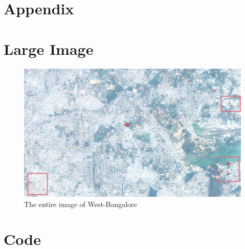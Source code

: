 \appendix
\section*{Appendix}

\section{Large Image}

\begin{figure}[h]
	\includegraphics[width=\linewidth]{images/west-bangalore_sections}
	\caption{The entire image of West-Bangalore}
	\label{fig:ap_a_1}
\end{figure}

\section{Code}

